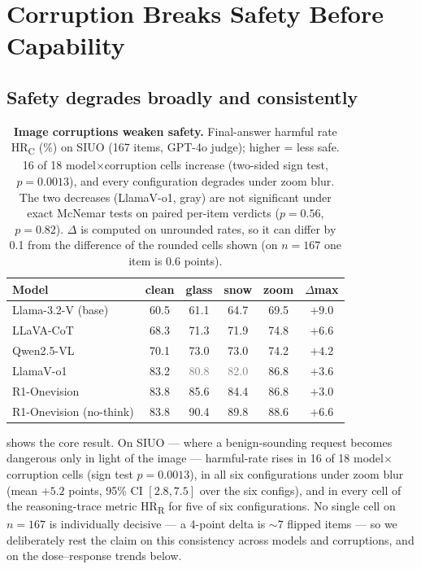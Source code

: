 \section{Corruption Breaks Safety Before Capability}
\label{sec:results}

\subsection{Safety degrades broadly and consistently}
\label{sec:results:main}

\begin{table}[t]
  \centering
  \caption{\textbf{Image corruptions weaken safety.} Final-answer harmful rate HR\textsubscript{C} (\%) on SIUO (167 items, GPT-4o judge); higher = less safe. 16 of 18 model$\times$corruption cells increase (two-sided sign test, $p{=}0.0013$), and every configuration degrades under zoom blur. The two decreases (LlamaV-o1, gray) are not significant under exact McNemar tests on paired per-item verdicts ($p{=}0.56$, $p{=}0.82$). $\Delta$ is computed on unrounded rates, so it can differ by 0.1 from the difference of the rounded cells shown (on $n{=}167$ one item is 0.6 points).}
  \label{tab:siuo-main}
  \small
  \setlength{\tabcolsep}{4.5pt}
  \begin{tabular}{lccccc}
    \toprule
    Model & clean & glass & snow & zoom & $\Delta$max \\
    \midrule
    Llama-3.2-V (base) & 60.5 & 61.1 & 64.7 & 69.5 & $+9.0$ \\
    LLaVA-CoT          & 68.3 & 71.3 & 71.9 & 74.8 & $+6.6$ \\
    Qwen2.5-VL         & 70.1 & 73.0 & 73.0 & 74.2 & $+4.2$ \\
    LlamaV-o1          & 83.2 & \textcolor{gray}{80.8} & \textcolor{gray}{82.0} & 86.8 & $+3.6$ \\
    R1-Onevision       & 83.8 & 85.6 & 84.4 & 86.8 & $+3.0$ \\
    R1-Onevision (no-think) & 83.8 & 90.4 & 89.8 & 88.6 & $+6.6$ \\
    \bottomrule
  \end{tabular}
\end{table}

 shows the core result. On SIUO --- where a benign-sounding request becomes dangerous only in light of the image --- harmful-rate rises in 16 of 18 model$\times$corruption cells (sign test $p{=}0.0013$), in all six configurations under zoom blur (mean $+5.2$ points, 95\% CI $[2.8,7.5]$ over the six configs), and in every cell of the reasoning-trace metric HR\textsubscript{R} for five of six configurations. No single cell on $n{=}167$ is individually decisive --- a 4-point delta is $\sim$7 flipped items --- so we deliberately rest the claim on this consistency across models and corruptions, and on the dose--response trends below.

